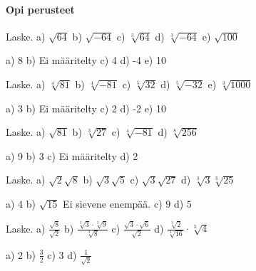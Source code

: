 \begin{tehtavasivu}

\paragraph*{Opi perusteet}


\begin{tehtava}
Laske.
a) $\sqrt{64}$ \quad b) $\sqrt{-64}$ \quad c) $\sqrt[3]{64}$ \quad d) $\sqrt[3]{-64}$ \quad  e) $\sqrt{100}$

\begin{vastaus}
a) 8 b) Ei määritelty c) 4 d) -4  e) 10
\end{vastaus}
\end{tehtava}

\begin{tehtava}
Laske.
a) $\sqrt[4]{81}$ \quad b) $\sqrt[4]{-81}$ \quad c) $\sqrt[5]{32}$ \quad d) $\sqrt[5]{-32}$  e) $\sqrt[3]{1000}$

\begin{vastaus}
a) 3 b) Ei määritelty c) 2 d) -2  e) 10
\end{vastaus}
\end{tehtava}

\begin{tehtava}
Laske.
a) $\sqrt{81}$ \quad b) $\sqrt[3]{27}$ \quad c) $\sqrt[4]{-81}$ \quad d) $\sqrt[8]{256}$ 

\begin{vastaus}
a) 9 b) 3 c) Ei määritelty d) 2
\end{vastaus}
\end{tehtava}

\begin{tehtava} Laske. 
a) $\sqrt{2}\sqrt{8}$  \quad b)  $\sqrt{3}\sqrt{5}$ \quad c)  $\sqrt{3}\sqrt{27}$ \quad  d) $\sqrt[3]{3}\sqrt[3]{25} $
\begin{vastaus}
a) $4$ \quad b) $\sqrt{15}$  \quad Ei sievene enempää.  \quad c) $9$ \quad d) $5$
\end{vastaus}
\end{tehtava}


\begin{tehtava} Laske. 
a) $ \frac{\sqrt{8}}{\sqrt{2}}$  \quad b)   $ \frac{\sqrt[3]{3} \cdot \sqrt[3]{9}}{\sqrt[3]{8}}$   \quad c)  $ \frac{\sqrt{3} \cdot \sqrt{6}}{\sqrt{2}}$ \quad d) $ \frac {\sqrt[3]{2}}{\sqrt[3]{16}} \cdot \sqrt[3]{4}$ 
\begin{vastaus}
a) $2$ \quad b) $\frac{3}{2}$  \quad c) $3$ \quad d) $\frac{1}{\sqrt{2}}$
\end{vastaus}
\end{tehtava}



\end{tehtavasivu}
